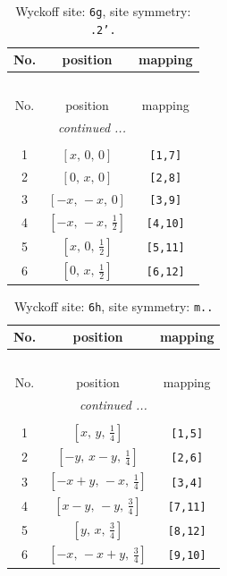 \documentclass[fleqn,8pt]{jsarticle}
\begin{document}
\renewcommand{\arraystretch}{1.2}
\begin{longtable}{ccc}
\caption{Wyckoff site: {\tt 6g}, site symmetry: {\tt .2'.}}
 \\
 \hline \hline
No. & position & mapping \\ \hline \endfirsthead

\multicolumn{2}{l}{\tablename\ \thetable{}} \\
 \hline \hline
No. & position & mapping \\ \hline \endhead

 \hline \hline
\multicolumn{2}{r}{\footnotesize\it continued ...} \\ \endfoot

 \hline \hline
\multicolumn{2}{r}{} \\ \endlastfoot

1 & $\left[ x,\, 0,\, 0 \right]$ & {\tt [1,7]} \\ \hline
2 & $\left[ 0,\, x,\, 0 \right]$ & {\tt [2,8]} \\ \hline
3 & $\left[ - x,\, - x,\, 0 \right]$ & {\tt [3,9]} \\ \hline
4 & $\left[ - x,\, - x,\, \frac{1}{2} \right]$ & {\tt [4,10]} \\ \hline
5 & $\left[ x,\, 0,\, \frac{1}{2} \right]$ & {\tt [5,11]} \\ \hline
6 & $\left[ 0,\, x,\, \frac{1}{2} \right]$ & {\tt [6,12]} \\
\end{longtable}
\renewcommand{\arraystretch}{1.2}
\begin{longtable}{ccc}
\caption{Wyckoff site: {\tt 6h}, site symmetry: {\tt m..}}
 \\
 \hline \hline
No. & position & mapping \\ \hline \endfirsthead

\multicolumn{2}{l}{\tablename\ \thetable{}} \\
 \hline \hline
No. & position & mapping \\ \hline \endhead

 \hline \hline
\multicolumn{2}{r}{\footnotesize\it continued ...} \\ \endfoot

 \hline \hline
\multicolumn{2}{r}{} \\ \endlastfoot

1 & $\left[ x,\, y,\, \frac{1}{4} \right]$ & {\tt [1,5]} \\ \hline
2 & $\left[ - y,\, x - y,\, \frac{1}{4} \right]$ & {\tt [2,6]} \\ \hline
3 & $\left[ - x + y,\, - x,\, \frac{1}{4} \right]$ & {\tt [3,4]} \\ \hline
4 & $\left[ x - y,\, - y,\, \frac{3}{4} \right]$ & {\tt [7,11]} \\ \hline
5 & $\left[ y,\, x,\, \frac{3}{4} \right]$ & {\tt [8,12]} \\ \hline
6 & $\left[ - x,\, - x + y,\, \frac{3}{4} \right]$ & {\tt [9,10]} \\
\end{longtable}
\end{document}
